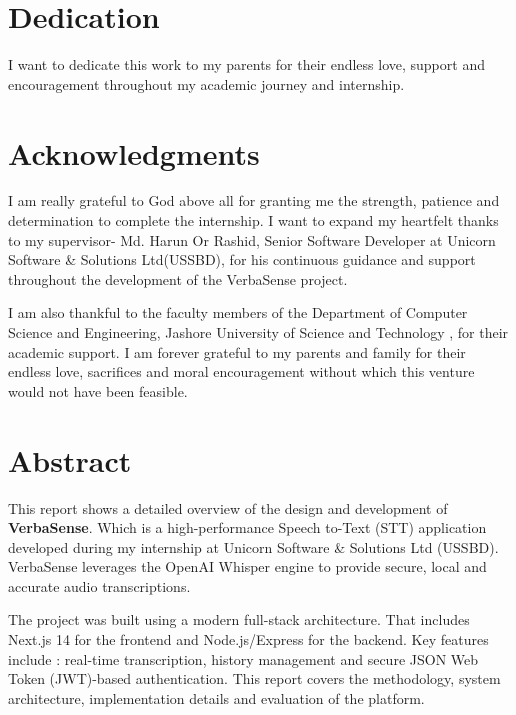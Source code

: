 \documentclass[oneside]{thesis-library}
\begin{document}

\chapter*{Dedication}
I want to dedicate this work to my parents for their endless love, support and encouragement throughout my academic journey and internship.

\chapter*{Acknowledgments}
I am really grateful to God above all for granting me the strength, patience and determination to complete the internship. I want to expand my heartfelt thanks to my supervisor- Md. Harun Or Rashid, Senior Software Developer at Unicorn Software & Solutions Ltd(USSBD), for his continuous guidance and support throughout the development of the VerbaSense project.

I am also thankful to the faculty members of the Department of Computer Science and Engineering, Jashore University of Science and Technology , for their academic support. I am forever grateful to my parents and family for their endless love, sacrifices and moral encouragement without which this venture would not have been feasible.

\clearpage
\tableofcontents

\chapter*{Abstract}
This report shows a detailed overview of the design and development of \textbf{VerbaSense}. Which is a high-performance Speech to-Text (STT) application developed during my internship at Unicorn Software \& Solutions Ltd (USSBD). VerbaSense leverages the OpenAI Whisper engine to provide secure, local and accurate audio transcriptions.

The project was built using a modern full-stack architecture. That includes Next.js 14 for the frontend and Node.js/Express for the backend. Key features include : real-time transcription, history management and secure JSON Web Token (JWT)-based authentication. This report covers the methodology, system architecture, implementation details and evaluation of the platform.

\clearpage
{}
\end{document}
